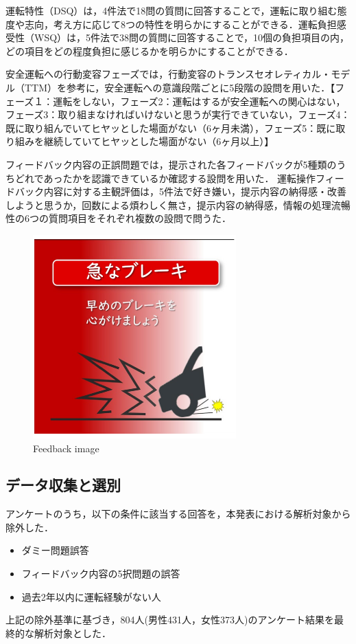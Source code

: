 \documentclass[twocolumn,a4j]{jarticle}
\begin{document}
運転特性（DSQ）は，4件法で18問の質問に回答することで，運転に取り組む態度や志向，考え方に応じて8つの特性を明らかにすることができる．運転負担感受性（WSQ）は，5件法で38問の質問に回答することで，10個の負担項目の内，どの項目をどの程度負担に感じるかを明らかにすることができる．

安全運転への行動変容フェーズでは，行動変容のトランスセオレティカル・モデル（TTM）\cite{phase}\cite{p1}\cite{p2}を参考に，安全運転への意識段階ごとに5段階の設問を用いた．【フェーズ１：運転をしない，フェーズ2：運転はするが安全運転への関心はない，フェーズ3：取り組まなければいけないと思うが実行できていない，フェーズ4：既に取り組んでいてヒヤッとした場面がない（6ヶ月未満），フェーズ5：既に取り組みを継続していてヒヤッとした場面がない（6ヶ月以上）】

フィードバック内容の正誤問題では，提示された各フィードバックが5種類のうちどれであったかを認識できているか確認する設問を用いた．
運転操作フィードバック内容に対する主観評価は，5件法で好き嫌い，提示内容の納得感・改善しようと思うか，回数による煩わしく無さ，提示内容の納得感，情報の処理流暢性の6つの質問項目をそれぞれ複数の設問で問うた．

\begin{figure}[t]
\centering
\includegraphics[scale=0.6]{fig/img.pdf}
\caption{Feedback image}
\label{img}
\end{figure}

\subsection{データ収集と選別}
\label{exception}
アンケートのうち，以下の条件に該当する回答を，本発表における解析対象から除外した．
\begin{itemize}
    \item ダミー問題誤答
    \item フィードバック内容の5択問題の誤答
    \item 過去2年以内に運転経験がない人
\end{itemize}
上記の除外基準に基づき，804人(男性431人，女性373人)のアンケート結果を最終的な解析対象とした．
\end{document}
